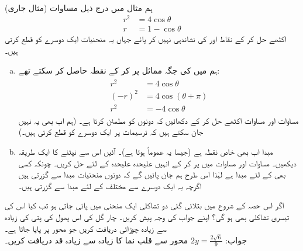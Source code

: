 \\
 (مثال  جاری)
ہم مثال  میں درج ذیل مساوات
\begin{align}
r^2&=4\cos\theta\label{مساوات_سوال_مخروط_معلوم_نہیں_الف}\\
r&=1-\cos\theta\label{مساوات_سوال_مخروط_معلوم_نہیں_ب}
\end{align}
اکٹھے حل کر کے  نقاط  اور  کی نشاندہی نہیں کر پائے جہاں یہ منحنیات ایک دوسرے کو قطع کرتی ہیں۔
\begin{enumerate}[a.]
\item
ہم  میں  کی جگہ مماثل  پر کر کے نقطہ  حاصل کر سکتے تھے:
\begin{gather}
\begin{aligned}\label{مساوات_سوال_مخروط_معلوم_نہیں_پ}
r^2&=4\cos\theta\\
(-r)^2&=4\cos(\theta+\pi)\\
r^2&=-4\cos\theta
\end{aligned}
\end{gather}
مساوات  اور مساوات  اکٹھے حل کر کے دکھائیں کہ  دونوں کو مطمئن کرتا ہے۔ (ہم اب بھی یہ نہیں جان سکتے ہیں کہ ترسیمات  پر ایک دوسرے کو قطع کرتی ہیں۔)
\item
مبدا اب بھی خاص نقطہ ہے (جیسا یہ عموماً ہوتا ہے)۔ آئیں اس سے نپٹنے کا ایک طریقہ دیکھیں۔ مساوات  اور مساوات  میں  پر کر کے انہیں علیحدہ علیحدہ  کے لئے حل کریں۔ چونکہ کسی بھی  کے لئے  مبدا ہے لہٰذا اس طرح ہم جان پائیں گے کہ دونوں منحنیات مبدا سے گزرتی ہیں اگرچہ یہ ایک دوسرے سے مختلف  کے لئے مبدا سے گزرتی ہیں۔
\end{enumerate}
اگر اس حصہ کے شروع میں بتلائی گئی دو تشاکلی ایک منحنی میں پائی جاتی ہو تب کیا اس کی تیسری تشاکلی بھی ہو گی؟  اپنے جواب کی وجہ پیش کریں۔
چار گل  کی اس پھول کی پتی کی زیادہ سے زیادہ چوڑائی دریافت کریں جو  محور پر پایا جاتا ہے۔\\
جواب:\quad 
$2y=\tfrac{2\sqrt{6}}{9}$
محور  سے قلب نما  کا زیادہ سے زیادہ قد دریافت کریں۔



